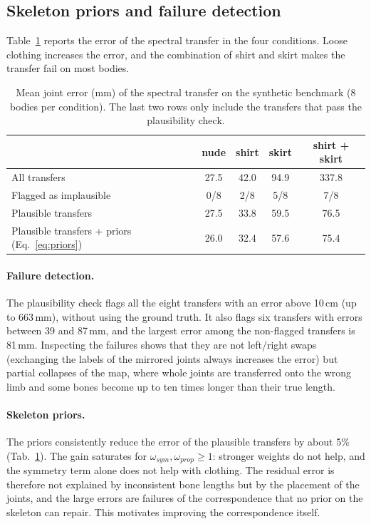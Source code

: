 \documentclass[11pt]{article}
\begin{document}
\subsection{Skeleton priors and failure detection}
\label{sec:exp_failures}

Table~\ref{tab:priors} reports the error of the spectral transfer in the four
conditions. Loose clothing increases the error, and the combination of shirt
and skirt makes the transfer fail on most bodies.

\begin{table}[t]
  \centering
  \caption{Mean joint error (mm) of the spectral transfer on the synthetic
  benchmark (8 bodies per condition). The last two rows only include the
  transfers that pass the plausibility check.}
  \label{tab:priors}
  \begin{tabular}{lcccc}
    \toprule
    & nude & shirt & skirt & shirt + skirt \\
    \midrule
    All transfers                          & 27.5 & 42.0 & 94.9 & 337.8 \\
    Flagged as implausible                 & 0/8  & 2/8  & 5/8  & 7/8   \\
    \midrule
    Plausible transfers                    & 27.5 & 33.8 & 59.5 & 76.5  \\
    Plausible transfers + priors (Eq.~\ref{eq:priors}) & 26.0 & 32.4 & 57.6 & 75.4 \\
    \bottomrule
  \end{tabular}
\end{table}

\paragraph{Failure detection.} The plausibility check flags all the eight
transfers with an error above 10\,cm (up to 663\,mm), without using the ground
truth. It also flags six transfers with errors between 39 and 87\,mm, and the
largest error among the non-flagged transfers is 81\,mm. Inspecting the
failures shows that they are not left/right swaps (exchanging the labels of the
mirrored joints always increases the error) but partial collapses of the map,
where whole joints are transferred onto the wrong limb and some bones become
up to ten times longer than their true length.

\paragraph{Skeleton priors.} The priors consistently reduce the error of the
plausible transfers by about 5\% (Tab.~\ref{tab:priors}). The gain saturates for
$\omega_{sym}, \omega_{prop} \geq 1$: stronger weights do not help, and the
symmetry term alone does not help with clothing. The residual error is
therefore not explained by inconsistent bone lengths but by the placement of
the joints, and the large errors are failures of the correspondence that no
prior on the skeleton can repair. This motivates improving the correspondence
itself.
\end{document}
